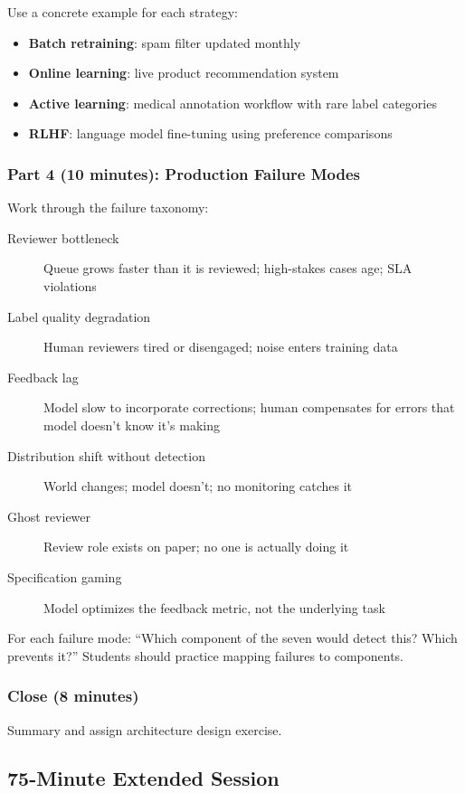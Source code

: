 Use a concrete example for each strategy:
\begin{itemize}
    \item \textbf{Batch retraining}: spam filter updated monthly
    \item \textbf{Online learning}: live product recommendation system
    \item \textbf{Active learning}: medical annotation workflow with rare label categories
    \item \textbf{RLHF}: language model fine-tuning using preference comparisons
\end{itemize}

\subsubsection{Part 4 (10 minutes): Production Failure Modes}

Work through the failure taxonomy:
\begin{description}
    \item[Reviewer bottleneck] Queue grows faster than it is reviewed; high-stakes cases age; SLA violations
    \item[Label quality degradation] Human reviewers tired or disengaged; noise enters training data
    \item[Feedback lag] Model slow to incorporate corrections; human compensates for errors that model doesn't know it's making
    \item[Distribution shift without detection] World changes; model doesn't; no monitoring catches it
    \item[Ghost reviewer] Review role exists on paper; no one is actually doing it
    \item[Specification gaming] Model optimizes the feedback metric, not the underlying task
\end{description}

\begin{trythis}
For each failure mode: ``Which component of the seven would detect this? Which prevents it?'' Students should practice mapping failures to components.
\end{trythis}

\subsubsection{Close (8 minutes)}
Summary and assign architecture design exercise.

\subsection{75-Minute Extended Session}

